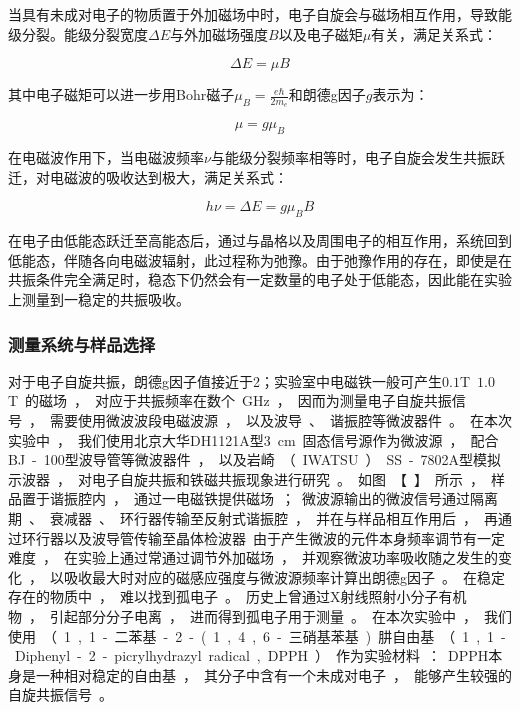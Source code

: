 \documentclass{thuemp}
\begin{document}
当具有未成对电子的物质置于外加磁场中时，电子自旋会与磁场相互作用，导致能级分裂。能级分裂宽度$\Delta E$与外加磁场强度$B$以及电子磁矩$\mu$有关，满足关系式：

\begin{equation}
\Delta E = \mu B
\end{equation}

其中电子磁矩可以进一步用Bohr磁子$\mu_B = \frac{e\hbar}{2m_e}$和朗德g因子$g$表示为：

\begin{equation}
\mu = g \mu_B
\end{equation}

在电磁波作用下，当电磁波频率$\nu$与能级分裂频率相等时，电子自旋会发生共振跃迁，对电磁波的吸收达到极大，满足关系式：

\begin{equation}
h \nu  = \Delta E = g \mu_B B
\end{equation}

在电子由低能态跃迁至高能态后，通过与晶格以及周围电子的相互作用，系统回到低能态，伴随各向电磁波辐射，此过程称为弛豫。由于弛豫作用的存在，即使是在共振条件完全满足时，稳态下仍然会有一定数量的电子处于低能态，因此能在实验上测量到一稳定的共振吸收。

\subsubsection{测量系统与样品选择}

对于电子自旋共振，朗德g因子值接近于2；实验室中电磁铁一般可产生$0.1$\si{\tesla}~$1.0$\si\tesla 的磁场，对应于共振频率在数个\si{\giga\hertz}，因而为测量电子自旋共振信号，需要使用微波波段电磁波源，以及波导、谐振腔等微波器件。

在本次实验中，我们使用北京大华DH1121A型3\si{\centi\meter}固态信号源作为微波源，配合BJ-100型波导管等微波器件，以及岩崎（IWATSU）SS-7802A型模拟示波器，对电子自旋共振和铁磁共振现象进行研究。如图【】所示，样品置于谐振腔内，通过一电磁铁提供磁场；微波源输出的微波信号通过隔离期、衰减器、环行器传输至反射式谐振腔，并在与样品相互作用后，再通过环行器以及波导管传输至晶体检波器

由于产生微波的元件本身频率调节有一定难度，在实验上通过常通过调节外加磁场，并观察微波功率吸收随之发生的变化，以吸收最大时对应的磁感应强度与微波源频率计算出朗德g因子。

在稳定存在的物质中，难以找到孤电子。历史上曾通过X射线照射小分子有机物，引起部分分子电离，进而得到孤电子用于测量。在本次实验中，我们使用（1,1-二苯基-2-(1,4,6-三硝基苯基)肼自由基（1,1-Diphenyl-2-picrylhydrazyl radical, DPPH）作为实验材料：DPPH本身是一种相对稳定的自由基，其分子中含有一个未成对电子，能够产生较强的自旋共振信号。
\end{document}
